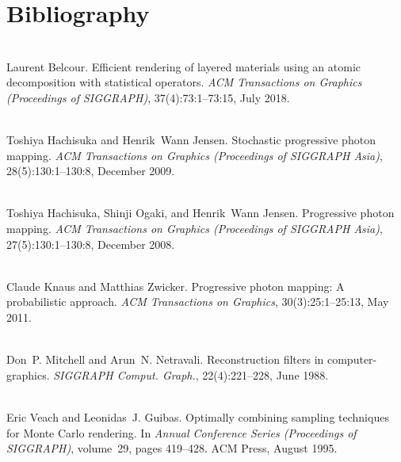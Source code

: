 \chapter{Bibliography}
\hypertarget{citelist}{}\label{citelist}

\begin{DoxyDescription}
\item[\label{citelist_CITEREF_Belcour:2018:Efficient}%
\Hypertarget{citelist_CITEREF_Belcour:2018:Efficient}%
\mbox{[}1\mbox{]}]\hfill \\
Laurent Belcour. Efficient rendering of layered materials using an atomic decomposition with statistical operators. {\itshape ACM Transactions on Graphics (Proceedings of SIGGRAPH)}, 37(4)\+:73\+:1--73\+:15, July 2018. 


\item[\label{citelist_CITEREF_Hachisuka:2009:Stochastic}%
\Hypertarget{citelist_CITEREF_Hachisuka:2009:Stochastic}%
\mbox{[}2\mbox{]}]\hfill \\
Toshiya Hachisuka and Henrik~Wann Jensen. Stochastic progressive photon mapping. {\itshape ACM Transactions on Graphics (Proceedings of SIGGRAPH Asia)}, 28(5)\+:130\+:1--130\+:8, December 2009. 


\item[\label{citelist_CITEREF_Hachisuka:2008:Progressive}%
\Hypertarget{citelist_CITEREF_Hachisuka:2008:Progressive}%
\mbox{[}3\mbox{]}]\hfill \\
Toshiya Hachisuka, Shinji Ogaki, and Henrik~Wann Jensen. Progressive photon mapping. {\itshape ACM Transactions on Graphics (Proceedings of SIGGRAPH Asia)}, 27(5)\+:130\+:1--130\+:8, December 2008. 


\item[\label{citelist_CITEREF_Knaus:2011:Progressive}%
\Hypertarget{citelist_CITEREF_Knaus:2011:Progressive}%
\mbox{[}4\mbox{]}]\hfill \\
Claude Knaus and Matthias Zwicker. Progressive photon mapping\+: A probabilistic approach. {\itshape ACM Transactions on Graphics}, 30(3)\+:25\+:1--25\+:13, May 2011. 


\item[\label{citelist_CITEREF_Mitchell:1988:Reconstruction}%
\Hypertarget{citelist_CITEREF_Mitchell:1988:Reconstruction}%
\mbox{[}5\mbox{]}]\hfill \\
Don~P. Mitchell and Arun~N. Netravali. Reconstruction filters in computer-\/graphics. {\itshape SIGGRAPH Comput. Graph.}, 22(4)\+:221--228, June 1988. 


\item[\label{citelist_CITEREF_Veach:1995:Optimally}%
\Hypertarget{citelist_CITEREF_Veach:1995:Optimally}%
\mbox{[}6\mbox{]}]\hfill \\
Eric Veach and Leonidas~J. Guibas. Optimally combining sampling techniques for Monte Carlo rendering. In {\itshape Annual Conference Series (Proceedings of SIGGRAPH)}, volume~29, pages 419--428. ACM Press, August 1995. 


\end{DoxyDescription}